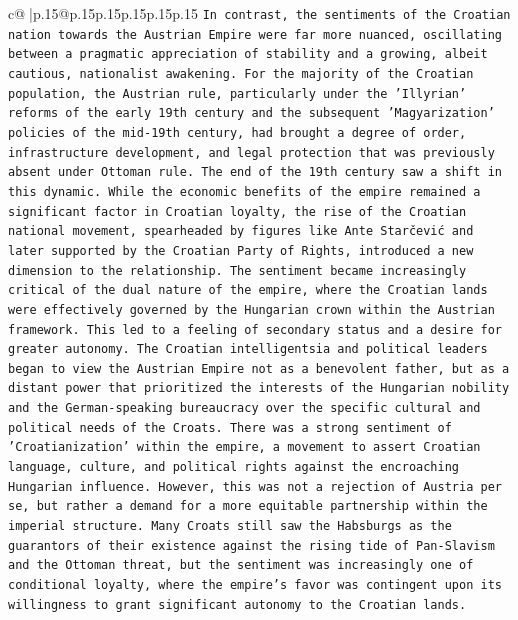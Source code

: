 \documentclass{article}
\begin{document}
{\begin{supertabular}{c@{$\;$}|p{.15\linewidth}@{}p{.15\linewidth}p{.15\linewidth}p{.15\linewidth}p{.15\linewidth}p{.15\linewidth}}
{{{\texttt{In contrast, the sentiments of the Croatian nation towards the Austrian Empire were far more nuanced, oscillating between a pragmatic appreciation of stability and a growing, albeit cautious, nationalist awakening. For the majority of the Croatian population, the Austrian rule, particularly under the 'Illyrian' reforms of the early 19th century and the subsequent 'Magyarization' policies of the mid{-}19th century, had brought a degree of order, infrastructure development, and legal protection that was previously absent under Ottoman rule. The end of the 19th century saw a shift in this dynamic. While the economic benefits of the empire remained a significant factor in Croatian loyalty, the rise of the Croatian national movement, spearheaded by figures like Ante Starčević and later supported by the Croatian Party of Rights, introduced a new dimension to the relationship. The sentiment became increasingly critical of the dual nature of the empire, where the Croatian lands were effectively governed by the Hungarian crown within the Austrian framework. This led to a feeling of secondary status and a desire for greater autonomy. The Croatian intelligentsia and political leaders began to view the Austrian Empire not as a benevolent father, but as a distant power that prioritized the interests of the Hungarian nobility and the German{-}speaking bureaucracy over the specific cultural and political needs of the Croats. There was a strong sentiment of 'Croatianization' within the empire, a movement to assert Croatian language, culture, and political rights against the encroaching Hungarian influence. However, this was not a rejection of Austria per se, but rather a demand for a more equitable partnership within the imperial structure. Many Croats still saw the Habsburgs as the guarantors of their existence against the rising tide of Pan{-}Slavism and the Ottoman threat, but the sentiment was increasingly one of conditional loyalty, where the empire's favor was contingent upon its willingness to grant significant autonomy to the Croatian lands.} \\
\\ 
}}}
\end{supertabular}}
\end{document}
